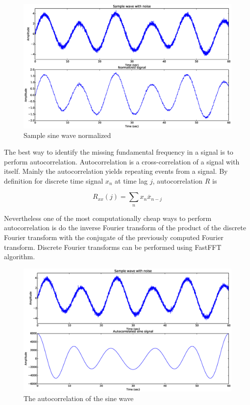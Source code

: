 \documentclass[12pt,a4paper]{report}
\begin{document}
\begin{figure}[h]
\centering
  \includegraphics[max height=\textheight, max width=\textwidth, keepaspectratio, scale=0.7]{09_normalized.eps}
\caption{Sample sine wave normalized}
\label{fig:normalized}
\end{figure}

The best way to identify the missing fundamental frequency in a signal is to perform autocorrelation. Autocorrelation is a cross-correlation of a signal with itself. Mainly the autocorrelation yields repeating events from a signal. By definition for discrete time signal $x_n$ at time lag $j$, autocorrelation $R$ is

\begin{equation}
 R_{xx}(j) = \sum_{n}x_n\overline{x}_{n-j}
\end{equation}

Nevertheless one of the most computationally cheap ways to perform autocorrelation is do the inverse Fourier transform of the product of the discrete Fourier transform with the conjugate of the previously computed Fourier transform. Discrete Fourier transforms can be performed using FastFFT algorithm.

\begin{figure}[h]
\centering
  \includegraphics[max height=\textheight, max width=\textwidth, keepaspectratio, scale=0.7]{10_autocorrelation.eps}
\caption{The autocorrelation of the sine wave}
\label{fig:autocorrelation}
\end{figure}
\end{document}
